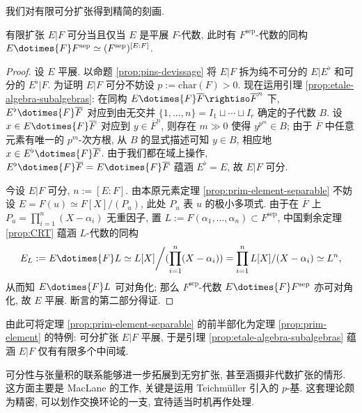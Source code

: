 我们对有限可分扩张得到精简的刻画.
\begin{proposition}\label{prop:etale-algebra-separable}
	有限扩张 $E|F$ 可分当且仅当 $E$ 是平展 $F$-代数, 此时有 $F^\mathrm{sep}$-代数的同构 $E \dotimes{F} F^\mathrm{sep} \simeq (F^\mathrm{sep})^{[E:F]}$.
\end{proposition}
\begin{proof}
	设 $E$ 平展. 以命题 \ref{prop:pins-devissage} 将 $E|F$ 拆为纯不可分的 $E|E^\flat$ 和可分的 $E^\flat|F$. 为证明 $E|F$ 可分不妨设 $p := \text{char}(F) > 0$. 现在运用引理 \ref{prop:etale-algebra-subalgebras}: 在同构 $E \dotimes{F} \overline{F} \rightiso \overline{F}^n$ 下, $E^\flat \dotimes{F} \overline{F}$ 对应到由无交并 $\{1, \ldots, n\} = I_1 \sqcup \cdots \sqcup I_r$ 确定的子代数 $B$. 设 $x \in E \dotimes{F} \overline{F}$ 对应到 $y \in \overline{F}^n$, 则存在 $m \gg 0$ 使得 $y^{p^m} \in B$; 由于 $\overline{F}$ 中任意元素有唯一的 $p^m$-次方根, 从 $B$ 的显式描述可知 $y \in B$, 相应地 $x \in E^\flat \dotimes{F} \overline{F}$. 由于我们都在域上操作, $E^\flat \dotimes{F} \overline{F} = E \dotimes{F} \overline{F}$ 蕴涵 $E^\flat = E$, 故 $E|F$ 可分.
	
	今设 $E|F$ 可分, $n := [E:F]$. 由本原元素定理 \ref{prop:prim-element-separable} 不妨设 $E = F(u) \simeq F[X]/(P_u)$, 此处 $P_u$ 表 $u$ 的极小多项式. 由于在 $\overline{F}$ 上 $P_u = \prod_{i=1}^n (X-\alpha_i)$ 无重因子, 置 $L := F(\alpha_1, \ldots, \alpha_n) \subset F^\text{sep}$, 中国剩余定理 \ref{prop:CRT} 蕴涵 $L$-代数的同构
	\[ E_L := E \dotimes{F} L \simeq L[X] \bigg/ ( \prod_{i=1}^n (X-\alpha_i) ) = \prod_{i=1}^n L[X]/(X-\alpha_i) \simeq L^n, \]
	从而知 $E \dotimes{F} L$ 可对角化; 那么 $F^\mathrm{sep}$-代数 $E \dotimes{F} F^\mathrm{sep}$ 亦可对角化, 故 $E$ 平展. 断言的第二部分得证.
\end{proof}
\begin{remark}
	由此可将定理 \ref{prop:prim-element-separable} 的前半部化为定理 \ref{prop:prim-element} 的特例: 可分扩张 $E|F$ 平展, 于是引理 \ref{prop:etale-algebra-subalgebras} 蕴涵 $E|F$ 仅有有限多个中间域.
\end{remark}

可分性与张量积的联系能够进一步拓展到无穷扩张, 甚至涵摄非代数扩张的情形. 这方面主要是 MacLane 的工作, 关键是运用 Teichmüller 引入的 $p$-基. 这套理论颇为精密, 可以划作交换环论的一支, 宜待适当时机再作处理.

